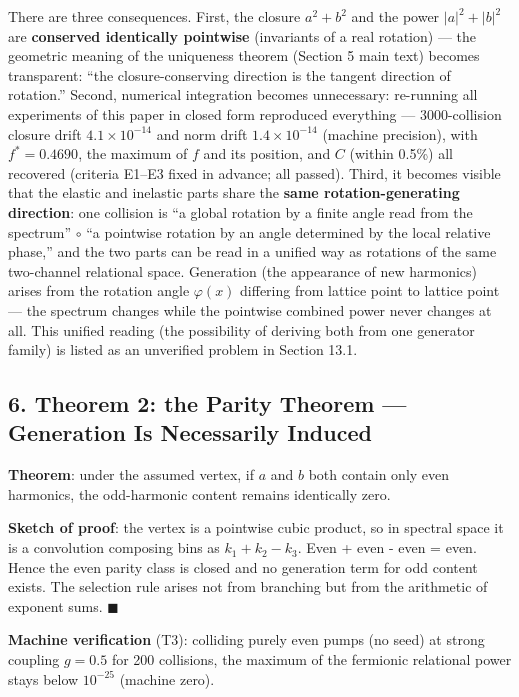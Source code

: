 \documentclass[
  a4paper,
]{article}
\begin{document}
There are three consequences. First, the closure \(a^2+b^2\) and the
power \(|a|^2+|b|^2\) are \textbf{conserved identically pointwise}
(invariants of a real rotation) --- the geometric meaning of the
uniqueness theorem (Section 5 main text) becomes transparent: ``the
closure-conserving direction is the tangent direction of rotation.''
Second, numerical integration becomes unnecessary: re-running all
experiments of this paper in closed form reproduced everything ---
3000-collision closure drift \(4.1\times10^{-14}\) and norm drift
\(1.4\times10^{-14}\) (machine precision), with \(f^*=0.4690\), the
maximum of \(f\) and its position, and \(C\) (within 0.5\%) all
recovered (criteria E1--E3 fixed in advance; all passed). Third, it
becomes visible that the elastic and inelastic parts share the
\textbf{same rotation-generating direction}: one collision is ``a global
rotation by a finite angle read from the spectrum'' \(\circ\) ``a
pointwise rotation by an angle determined by the local relative phase,''
and the two parts can be read in a unified way as rotations of the same
two-channel relational space. Generation (the appearance of new
harmonics) arises from the rotation angle \(\varphi(x)\) differing from
lattice point to lattice point --- the spectrum changes while the
pointwise combined power never changes at all. This unified reading (the
possibility of deriving both from one generator family) is listed as an
unverified problem in Section 13.1.

\subsection{6. Theorem 2: the Parity Theorem --- Generation Is
Necessarily
Induced}\label{theorem-2-the-parity-theorem-generation-is-necessarily-induced}

\textbf{Theorem}: under the assumed vertex, if \(a\) and \(b\) both
contain only even harmonics, the odd-harmonic content remains
identically zero.

\textbf{Sketch of proof}: the vertex is a pointwise cubic product, so in
spectral space it is a convolution composing bins as
\(k_1 + k_2 - k_3\). Even + even - even = even. Hence the even parity
class is closed and no generation term for odd content exists. The
selection rule arises not from branching but from the arithmetic of
exponent sums. \(\blacksquare\)

\textbf{Machine verification} (T3): colliding purely even pumps (no
seed) at strong coupling \(g=0.5\) for 200 collisions, the maximum of
the fermionic relational power stays below \(10^{-25}\) (machine zero).
\end{document}

